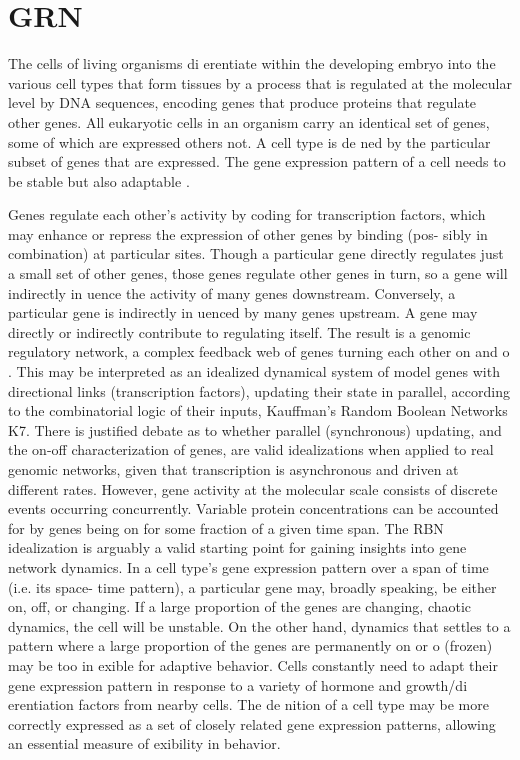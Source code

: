 \section{GRN}
The cells of living organisms di erentiate within the developing embryo into
the various cell types that form tissues by a process that is regulated at the
molecular level by DNA sequences, encoding genes that produce proteins that
regulate other genes. All eukaryotic cells in an organism carry an identical set
of genes, some of which are expressed others not. A cell type is de ned by the
particular subset of genes that are expressed. The gene expression pattern of
a cell needs to be stable but also adaptable \cite{K41}.



Genes regulate each other's activity by coding for transcription factors,
which may enhance or repress the expression of other genes by binding (pos-
sibly in combination) at particular sites. Though a particular gene directly
regulates just a small set of other genes, those genes regulate other genes in
turn, so a gene will indirectly in uence the activity of many genes downstream.
Conversely, a particular gene is indirectly in uenced by many genes upstream.
A gene may directly or indirectly contribute to regulating itself. The result is
a genomic regulatory network, a complex feedback web of genes turning each
other on and o . This may be interpreted as an idealized dynamical system of
model genes with directional links (transcription factors), updating
their state in parallel, according to the combinatorial logic of their
inputs, Kauffman's Random Boolean Networks \cite{K1}{K7}.
There is justified debate as to whether parallel (synchronous) updating,
and the on-off characterization of genes, are valid idealizations when applied
to real genomic networks, given that transcription is asynchronous and driven
at different rates. However, gene activity at the molecular scale consists of
discrete events occurring concurrently. Variable protein concentrations can be
accounted for by genes being on for some fraction of a given time span. The
RBN idealization is arguably a valid starting point for gaining insights into
gene network dynamics.
In a cell type's gene expression pattern over a span of time (i.e. its space-
time pattern), a particular gene may, broadly speaking, be either on, off, or
changing. If a large proportion of the genes are changing, chaotic dynamics, the cell will be unstable. On the other hand, dynamics that settles to
a pattern where a large proportion of the genes are permanently on or o
(frozen) may be too in exible for adaptive behavior. Cells constantly need to
adapt their gene expression pattern in response to a variety of hormone and
growth/di erentiation factors from nearby cells. The de nition of a cell type
may be more correctly expressed as a set of closely related gene expression
patterns, allowing an essential measure of exibility in behavior.
